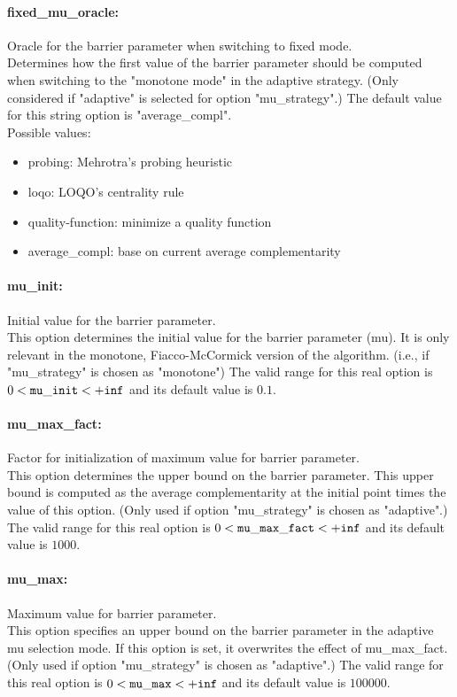 \paragraph{fixed\_mu\_oracle:} Oracle for the barrier parameter when switching to fixed mode. $\;$ \\
 Determines how the first value of the barrier
parameter should be computed when switching to
the "monotone mode" in the adaptive strategy.
(Only considered if "adaptive" is selected for
option "mu\_strategy".)
The default value for this string option is "average\_compl".
\\ 
Possible values:
\begin{itemize}
   \item probing: Mehrotra's probing heuristic
   \item loqo: LOQO's centrality rule
   \item quality-function: minimize a quality function
   \item average\_compl: base on current average complementarity
\end{itemize}

\paragraph{mu\_init:} Initial value for the barrier parameter. $\;$ \\
 This option determines the initial value for the
barrier parameter (mu).  It is only relevant in
the monotone, Fiacco-McCormick version of the
algorithm. (i.e., if "mu\_strategy" is chosen as
"monotone") The valid range for this real option is 
$0 <  {\tt mu\_init } <  {\tt +inf}$
and its default value is $0.1$.


\paragraph{mu\_max\_fact:} Factor for initialization of maximum value for barrier parameter. $\;$ \\
 This option determines the upper bound on the
barrier parameter.  This upper bound is computed
as the average complementarity at the initial
point times the value of this option. (Only used
if option "mu\_strategy" is chosen as "adaptive".) The valid range for this real option is 
$0 <  {\tt mu\_max\_fact } <  {\tt +inf}$
and its default value is $1000$.


\paragraph{mu\_max:} Maximum value for barrier parameter. $\;$ \\
 This option specifies an upper bound on the
barrier parameter in the adaptive mu selection
mode.  If this option is set, it overwrites the
effect of mu\_max\_fact. (Only used if option
"mu\_strategy" is chosen as "adaptive".) The valid range for this real option is 
$0 <  {\tt mu\_max } <  {\tt +inf}$
and its default value is $100000$.


